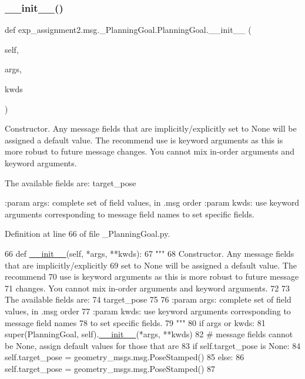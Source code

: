 \subsubsection{\texorpdfstring{\+\_\+\+\_\+init\+\_\+\+\_\+()}{\_\_init\_\_()}}
{\footnotesize\ttfamily def exp\+\_\+assignment2.\+msg.\+\_\+\+Planning\+Goal.\+Planning\+Goal.\+\_\+\+\_\+init\+\_\+\+\_\+ (\begin{DoxyParamCaption}\item[{}]{self,  }\item[{}]{args,  }\item[{}]{kwds }\end{DoxyParamCaption})}

\begin{DoxyVerb}Constructor. Any message fields that are implicitly/explicitly
set to None will be assigned a default value. The recommend
use is keyword arguments as this is more robust to future message
changes.  You cannot mix in-order arguments and keyword arguments.

The available fields are:
   target_pose

:param args: complete set of field values, in .msg order
:param kwds: use keyword arguments corresponding to message field names
to set specific fields.
\end{DoxyVerb}
 

Definition at line 66 of file \+\_\+\+Planning\+Goal.\+py.


\begin{DoxyCode}
66   \textcolor{keyword}{def }\hyperlink{classstate__machine_1_1Play_a5993a23d8be7f7b2647f71ede0334957}{\_\_init\_\_}(self, *args, **kwds):
67     \textcolor{stringliteral}{"""}
68 \textcolor{stringliteral}{    Constructor. Any message fields that are implicitly/explicitly}
69 \textcolor{stringliteral}{    set to None will be assigned a default value. The recommend}
70 \textcolor{stringliteral}{    use is keyword arguments as this is more robust to future message}
71 \textcolor{stringliteral}{    changes.  You cannot mix in-order arguments and keyword arguments.}
72 \textcolor{stringliteral}{}
73 \textcolor{stringliteral}{    The available fields are:}
74 \textcolor{stringliteral}{       target\_pose}
75 \textcolor{stringliteral}{}
76 \textcolor{stringliteral}{    :param args: complete set of field values, in .msg order}
77 \textcolor{stringliteral}{    :param kwds: use keyword arguments corresponding to message field names}
78 \textcolor{stringliteral}{    to set specific fields.}
79 \textcolor{stringliteral}{    """}
80     \textcolor{keywordflow}{if} args \textcolor{keywordflow}{or} kwds:
81       super(PlanningGoal, self).\hyperlink{classstate__machine_1_1Play_a5993a23d8be7f7b2647f71ede0334957}{\_\_init\_\_}(*args, **kwds)
82       \textcolor{comment}{# message fields cannot be None, assign default values for those that are}
83       \textcolor{keywordflow}{if} self.target\_pose \textcolor{keywordflow}{is} \textcolor{keywordtype}{None}:
84         self.target\_pose = geometry\_msgs.msg.PoseStamped()
85     \textcolor{keywordflow}{else}:
86       self.target\_pose = geometry\_msgs.msg.PoseStamped()
87 
\end{DoxyCode}


